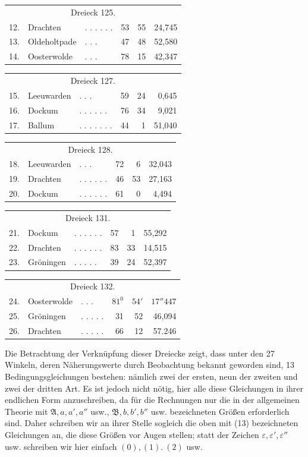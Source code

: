 \begin{center}
\begin{tabular}{r l l r r r}
\multicolumn{6}{c}{Dreieck 125.}\\[5pt]
12.&Drachten&. . . . . .&53&55&24,745\\
13.&Oldeholtpade&. . .&47&48&52,580\\
14.&Oosterwolde&. . .&78&15&42,347
\end{tabular}
\end{center}
\begin{center}
\begin{tabular}{r l l r r r}
\multicolumn{6}{c}{Dreieck 127.}\\[5pt]
15.&Leeuwarden&. . .&59&24&0,645\\
16.&Dockum&. . . . . .&76&34&9,021\\
17.&Ballum&. . . . . . .&44&1&51,040
\end{tabular}
\end{center}
\begin{center}
\begin{tabular}{r l l r r r}
\multicolumn{6}{c}{Dreieck 128.}\\[5pt]
18.&Leeuwarden&. . .&72&6&32,043\\
19.&Drachten&. . . . . .&46&53&27,163\\
20.&Dockum&. . . . . .&61&0&4,494
\end{tabular}
\end{center}
\begin{center}
\begin{tabular}{r l l r r r}
\multicolumn{6}{c}{Dreieck 131.}\\[5pt]
21.&Dockum&. . . . . .&57&1&55,292\\
22.&Drachten&. . . . . .&83&33&14,515\\
23.&Gröningen&. . . . .&39&24&52,397
\end{tabular}
\end{center}
\begin{center}
\begin{tabular}{r l l r r r}
\multicolumn{6}{c}{Dreieck 132.}\\[5pt]
24.&Oosterwolde&. . .&\(81^0\)&\(54'\)&\(17''447\)\\
25.&Gröningen&. . . . .&31&52&46,094\\
26.&Drachten&. . . . .&66&12&57.246
\end{tabular}
\end{center}

Die Betrachtung der Verknüpfung dieser Dreiecke zeigt, dass unter den 27 Winkeln, deren Näherungswerte durch Beobachtung bekannt geworden sind, 13 Bedingungsgleichungen bestehen: nämlich zwei der ersten, neun der zweiten und zwei der dritten Art. Es ist jedoch nicht nötig, hier alle diese Gleichungen in ihrer endlichen Form anzuschreiben, da für die Rechnungen nur die in der allgemeinen Theorie mit \(\mathfrak A,a,a',a''\) usw., \(\mathfrak B,b,b',b''\) usw. bezeichneten Größen erforderlich sind. Daher schreiben wir an ihrer Stelle sogleich die oben mit (13) bezeichneten Gleichungen an, die diese Größen vor Augen stellen; statt der Zeichen \(\varepsilon,\varepsilon',\varepsilon''\) usw. schreiben wir hier einfach \((0),(1).\ (2)\) usw.

